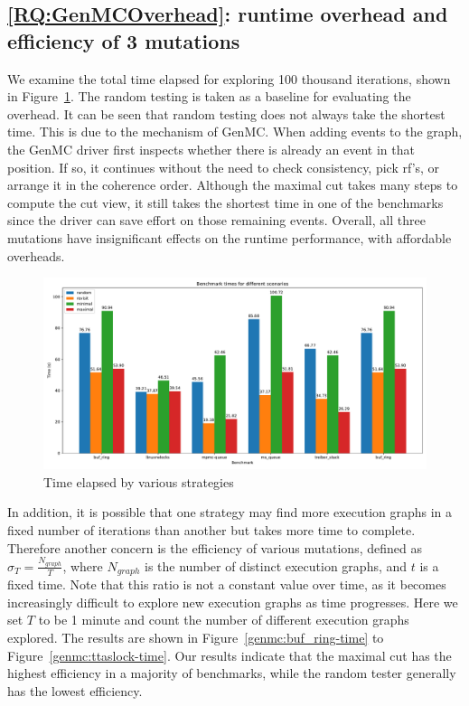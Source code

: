\subsection{\ref*{RQ:GenMCOverhead}: runtime overhead and efficiency of 3 mutations }

We examine the total time elapsed for exploring 100 thousand iterations, shown in Figure~\ref{genmc:overhead}. The random testing is taken as a baseline for evaluating the overhead. It can be seen that random testing does not always take the shortest time. This is due to the mechanism of GenMC. When adding events to the graph, the GenMC driver first inspects whether there is already an event in that position. If so, it continues without the need to check consistency, pick rf's, or arrange it in the coherence order. Although the maximal cut takes many steps to compute the cut view, it still takes the shortest time in one of the benchmarks since the driver can save effort on those remaining events. Overall, all three mutations have insignificant effects on the runtime performance, with affordable overheads.




\begin{figure}[h!tbp]
	\centering
	\includegraphics[scale=0.37]{figure/genmc/overhead.pdf}
	\caption{Time elapsed by various strategies}
	\label{genmc:overhead}
\end{figure}

In addition, it is possible that one strategy may find more execution graphs in a fixed number of iterations than another but takes more time to complete. Therefore another concern is the efficiency of various mutations, defined as $\sigma_T = \frac{N_{graph}}{T}$, where $N_{graph}$ is the number of distinct execution graphs, and $t$ is a fixed time. Note that this ratio is not a constant value over time, as it becomes increasingly difficult to explore new execution graphs as time progresses. Here we set $T$ to be 1 minute and count the number of different execution graphs explored. The results are shown in Figure~\ref{genmc:buf_ring-time} to Figure~\ref{genmc:ttaslock-time}. Our results indicate that the maximal cut has the highest efficiency in a majority of benchmarks, while the random tester generally has the lowest efficiency.




